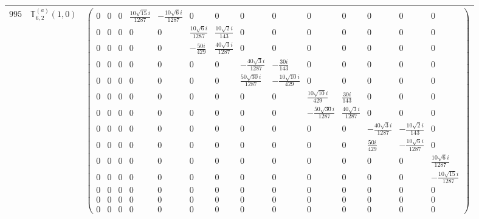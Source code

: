 \documentclass[fleqn,8pt,landscape]{jsarticle}
\begin{document}
\begin{center}
\begin{longtable}{ccc}
$ 995 $ & $ \mathbb{T}_{6,2}^{(a)}(1,0) $ & $ \begin{pmatrix} 0 & 0 & 0 & \frac{10 \sqrt{15} i}{1287} & - \frac{10 \sqrt{6} i}{1287} & 0 & 0 & 0 & 0 & 0 & 0 & 0 & 0 & 0 \\ 0 & 0 & 0 & 0 & 0 & \frac{10 \sqrt{6} i}{1287} & \frac{10 \sqrt{2} i}{143} & 0 & 0 & 0 & 0 & 0 & 0 & 0 \\ 0 & 0 & 0 & 0 & 0 & - \frac{50 i}{429} & \frac{40 \sqrt{3} i}{1287} & 0 & 0 & 0 & 0 & 0 & 0 & 0 \\ 0 & 0 & 0 & 0 & 0 & 0 & 0 & - \frac{40 \sqrt{3} i}{1287} & - \frac{30 i}{143} & 0 & 0 & 0 & 0 & 0 \\ 0 & 0 & 0 & 0 & 0 & 0 & 0 & \frac{50 \sqrt{30} i}{1287} & - \frac{10 \sqrt{10} i}{429} & 0 & 0 & 0 & 0 & 0 \\ 0 & 0 & 0 & 0 & 0 & 0 & 0 & 0 & 0 & \frac{10 \sqrt{10} i}{429} & \frac{30 i}{143} & 0 & 0 & 0 \\ 0 & 0 & 0 & 0 & 0 & 0 & 0 & 0 & 0 & - \frac{50 \sqrt{30} i}{1287} & \frac{40 \sqrt{3} i}{1287} & 0 & 0 & 0 \\ 0 & 0 & 0 & 0 & 0 & 0 & 0 & 0 & 0 & 0 & 0 & - \frac{40 \sqrt{3} i}{1287} & - \frac{10 \sqrt{2} i}{143} & 0 \\ 0 & 0 & 0 & 0 & 0 & 0 & 0 & 0 & 0 & 0 & 0 & \frac{50 i}{429} & - \frac{10 \sqrt{6} i}{1287} & 0 \\ 0 & 0 & 0 & 0 & 0 & 0 & 0 & 0 & 0 & 0 & 0 & 0 & 0 & \frac{10 \sqrt{6} i}{1287} \\ 0 & 0 & 0 & 0 & 0 & 0 & 0 & 0 & 0 & 0 & 0 & 0 & 0 & - \frac{10 \sqrt{15} i}{1287} \\ 0 & 0 & 0 & 0 & 0 & 0 & 0 & 0 & 0 & 0 & 0 & 0 & 0 & 0 \\ 0 & 0 & 0 & 0 & 0 & 0 & 0 & 0 & 0 & 0 & 0 & 0 & 0 & 0 \\ 0 & 0 & 0 & 0 & 0 & 0 & 0 & 0 & 0 & 0 & 0 & 0 & 0 & 0 \end{pmatrix} $ \\ \hline

\end{longtable}
\end{center}
\end{document}

